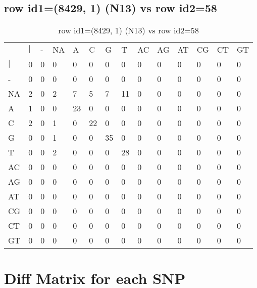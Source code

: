 \subsection{row id1=(8429, 1) (N13) vs row id2=58}
\begin{center}
\begin{longtable}{|l|l|l|l|l|l|l|l|l|l|l|l|l|l|}
\caption{row id1=(8429, 1) (N13) vs row id2=58} \label{table_dm686}\\
\hline
\\
\hline
&$|$&-&NA&A&C&G&T&AC&AG&AT&CG&CT&GT\\
$|$&0&0&0&0&0&0&0&0&0&0&0&0&0\\
-&0&0&0&0&0&0&0&0&0&0&0&0&0\\
NA&2&0&2&7&5&7&11&0&0&0&0&0&0\\
A&1&0&0&23&0&0&0&0&0&0&0&0&0\\
C&2&0&1&0&22&0&0&0&0&0&0&0&0\\
G&0&0&1&0&0&35&0&0&0&0&0&0&0\\
T&0&0&2&0&0&0&28&0&0&0&0&0&0\\
AC&0&0&0&0&0&0&0&0&0&0&0&0&0\\
AG&0&0&0&0&0&0&0&0&0&0&0&0&0\\
AT&0&0&0&0&0&0&0&0&0&0&0&0&0\\
CG&0&0&0&0&0&0&0&0&0&0&0&0&0\\
CT&0&0&0&0&0&0&0&0&0&0&0&0&0\\
GT&0&0&0&0&0&0&0&0&0&0&0&0&0\\
\hline
\end{longtable}
\end{center}

\section{Diff Matrix for each SNP} \label{section_snp_wise}
